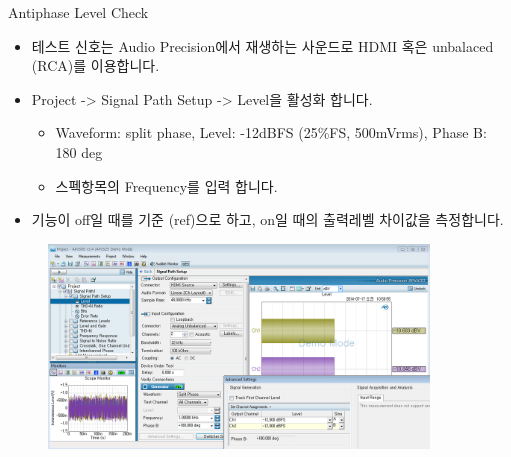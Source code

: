 \documentclass{beamer}
\begin{document}
	
	\begin{frame}[t]{Antiphase Level Check}
		\begin{itemize}
			\item 테스트 신호는 Audio Precision에서 재생하는 사운드로 HDMI 혹은 unbalaced (RCA)를 이용합니다.
			\item Project -> Signal Path Setup -> Level을 활성화 합니다.
			\begin{itemize}
				\item Waveform: split phase, Level: -12dBFS (25\%FS, 500mVrms), Phase B: 180 deg
				\item 스펙항목의 Frequency를 입력 합니다.
			\end{itemize}
			\item 기능이 off일 때를 기준 (ref)으로 하고, on일 때의 출력레벨 차이값을 측정합니다.
		\end{itemize}
		
		\begin{figure}[b]
			\includegraphics[width=0.9\textwidth]{figure/apsetting/antiphaseLevel.png}
		\end{figure}
		
	\end{frame}
	
\end{document}
